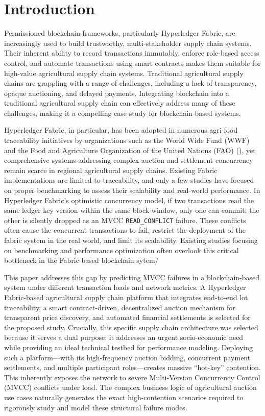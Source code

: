 ﻿\documentclass[12pt]{article}
\begin{document}
	
	\newpage
	\section{Introduction}

Permissioned blockchain frameworks, particularly Hyperledger Fabric, are increasingly used to build trustworthy, multi-stakeholder supply chain systems. Their inherent ability to record transactions immutably,  enforce role-based access control, and automate transactions using smart contracts makes them suitable for high-value agricultural supply chain systems. Traditional agricultural supply chains are grappling with a range of challenges, including a lack of transparency, opaque auctioning, and delayed payments. Integrating blockchain into a traditional agricultural supply chain can effectively address many of these challenges, making it a compelling case study for blockchain-based systems.

Hyperledger Fabric, in particular, has been adopted in numerous agri-food traceability initiatives by organizations such as the World Wide Fund (WWF) and the Food and Agriculture Organization of the United Nations (FAO) (\citet{world_wildlife_fund_wwf_wwf_2019}), yet comprehensive systems addressing complex auction and settlement concurrency remain scarce in regional agricultural supply chains. Existing Fabric implementations are limited to traceability, and only a few studies have focused on proper benchmarking to assess their scalability and real-world performance.  In Hyperledger Fabric's optimistic concurrency model, if two transactions read the same ledger key version within the same block window, only one can commit; the other is silently dropped as an MVCC \texttt{READ\_CONFLICT} failure. These conflicts often cause the concurrent transactions to fail, restrict the deployment of the fabric system in the real world, and limit its scalability. Existing studies focusing on benchmarking and performance optimization often overlook this critical bottleneck in the Fabric-based blockchain sytem/

This paper addresses this gap by predicting MVCC failures in a blockchain-based system under different transaction loads and network metrics. A Hyperledger Fabric-based agricultural supply chain platform that integrates end-to-end lot traceability, a smart contract-driven, decentralized auction mechanism for transparent price discovery, and automated financial settlements is selected for the proposed study. Crucially, this specific supply chain architecture was selected because it serves a dual purpose: it addresses an urgent socio-economic need while providing an ideal technical testbed for performance modeling. Deploying such a platform---with its high-frequency auction bidding, concurrent payment settlements, and multiple participant roles---creates massive ``hot-key'' contention. This inherently exposes the network to severe Multi-Version Concurrency Control (MVCC) conflicts under load. The complex business logic of agricultural auction use cases naturally generates the exact high-contention scenarios required to rigorously study and model these structural failure modes.
\end{document}
